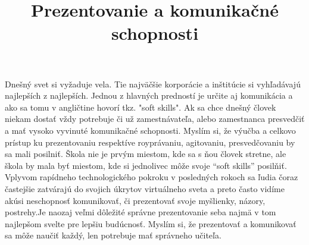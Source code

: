 \documentclass[10pt,oneside,slovak,a4paper]{article}
\begin{document}
\title{Prezentovanie a komunikačné schopnosti}
\maketitle\newline

Dnešný svet si vyžaduje vela. Tie najväčšie korporácie a inštitúcie si vyhľadávajú najlepších z najlepších. Jednou z hlavných predností je určite aj komunikácia a ako sa tomu v angličtine hovorí tkz. "soft skills". Ak sa chce dnešný človek niekam dostať vždy potrebuje či už zamestnávateľa, alebo zamestnanca presvedčiť a mať vysoko vyvinuté komunikačné schopnosti. Myslím si, že výučba a celkovo prístup ku prezentovaniu respektíve royprávaniu, agitovaniu, presvedčovaniu by sa mali posilniť. Škola nie je prvým miestom, kde sa s ňou človek stretne, ale škola by mala byť miestom, kde si jednolivec môže svoje “soft skills” posilňiť. Vplyvom rapídneho technologického pokroku v posledných rokoch sa ľudia čoraz častejšie zatvárajú do svojich úkrytov virtuálneho sveta a preto často vidíme akúsi neschopnosť komunikovať, či prezentovať svoje myšlienky, názory, postrehy.Je naozaj veľmi dôležité správne prezentovanie seba najmä v tom najlepšom svelte pre lepšiu budúcnosť. Myslím si, že prezentovať a komunikovať sa môže naučiť každý, len potrebuje mať správneho učiteľa.
\end{document}
